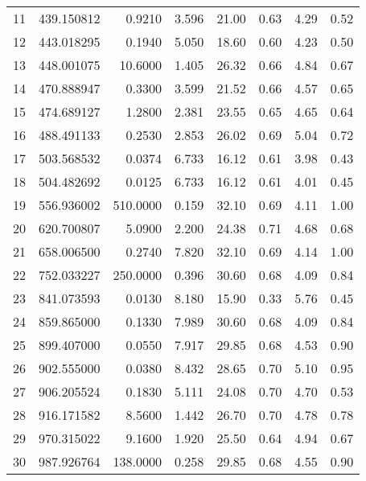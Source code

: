 \begin{longtable}{rrrrrrrr}
11    &   439.150812&    0.9210&  3.596&   21.00&   0.63&  4.29&  0.52\\
12    &   443.018295&    0.1940&  5.050&   18.60&   0.60&  4.23&  0.50\\
13    &   448.001075&   10.6000&  1.405&   26.32&   0.66&  4.84&  0.67\\
14    &   470.888947&    0.3300&  3.599&   21.52&   0.66&  4.57&  0.65\\
15    &   474.689127&    1.2800&  2.381&   23.55&   0.65&  4.65&  0.64\\
16    &   488.491133&    0.2530&  2.853&   26.02&   0.69&  5.04&  0.72\\
17    &   503.568532&    0.0374&  6.733&   16.12&   0.61&  3.98&  0.43\\
18    &   504.482692&    0.0125&  6.733&   16.12&   0.61&  4.01&  0.45\\
19    &   556.936002&  510.0000&  0.159&   32.10&   0.69&  4.11&  1.00\\
20    &   620.700807&    5.0900&  2.200&   24.38&   0.71&  4.68&  0.68\\
21    &   658.006500&    0.2740&  7.820&   32.10&   0.69&  4.14&  1.00\\
22    &   752.033227&  250.0000&  0.396&   30.60&   0.68&  4.09&  0.84\\
23    &   841.073593&    0.0130&  8.180&   15.90&   0.33&  5.76&  0.45\\
24    &   859.865000&    0.1330&  7.989&   30.60&   0.68&  4.09&  0.84\\
25    &   899.407000&    0.0550&  7.917&   29.85&   0.68&  4.53&  0.90\\
26    &   902.555000&    0.0380&  8.432&   28.65&   0.70&  5.10&  0.95\\
27    &   906.205524&    0.1830&  5.111&   24.08&   0.70&  4.70&  0.53\\
28    &   916.171582&    8.5600&  1.442&   26.70&   0.70&  4.78&  0.78\\
29    &   970.315022&    9.1600&  1.920&   25.50&   0.64&  4.94&  0.67\\
30    &   987.926764&  138.0000&  0.258&   29.85&   0.68&  4.55&  0.90\\
\hline
\end{longtable}

